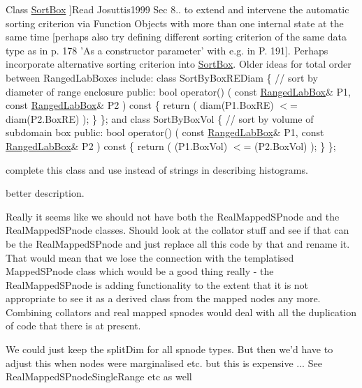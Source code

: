 \begin{DoxyRefList}
\-Class \hyperlink{classSortBox}{\-Sort\-Box} ]\-Read \-Josuttis1999 \-Sec 8.. to extend and intervene the automatic sorting criterion via \-Function \-Objects with more than one internal state at the same time \mbox{[}perhaps also try defining different sorting criterion of the same data type as in p. 178 '\-As a constructor parameter' with e.\-g. in \-P. 191\mbox{]}. \-Perhaps incorporate alternative sorting criterion into \hyperlink{classSortBox}{\-Sort\-Box}. \-Older ideas for total order between \-Ranged\-Lab\-Boxes include\-: class \-Sort\-By\-Box\-R\-E\-Diam \{ // sort by diameter of range enclosure public\-: bool operator() ( const \hyperlink{classRangedLabBox}{\-Ranged\-Lab\-Box}\& \-P1, const \hyperlink{classRangedLabBox}{\-Ranged\-Lab\-Box}\& \-P2 ) const \{ return ( diam(\-P1.\-Box\-R\-E) $<$= diam(\-P2.\-Box\-R\-E) ); \} \}; and class \-Sort\-By\-Box\-Vol \{ // sort by volume of subdomain box public\-: bool operator() ( const \hyperlink{classRangedLabBox}{\-Ranged\-Lab\-Box}\& \-P1, const \hyperlink{classRangedLabBox}{\-Ranged\-Lab\-Box}\& \-P2 ) const \{ return ( (\-P1.\-Box\-Vol) $<$= (\-P2.\-Box\-Vol) ); \} \};  
\item[\label{todo__todo000001}%
\hypertarget{todo__todo000001}{}%
\-Class \hyperlink{classsubpavings_1_1HistDescription}{subpavings\-:\-:\-Hist\-Description} ]complete this class and use instead of strings in describing histograms. 
\item[\label{todo__todo000003}%
\hypertarget{todo__todo000003}{}%
\-Member \hyperlink{classsubpavings_1_1MappedSPnode_a83d5b7a4609c73e1818fe2d3231c0979}{subpavings\-:\-:\-Mapped\-S\-Pnode$<$ \-T $>$\-:\-:slice} (const std\-::vector$<$ int $>$ \&slice\-Dims, const std\-::vector$<$ cxsc\-::real $>$ \&slice\-Pts)]better description.  
\item[\label{todo__todo000007}%
\hypertarget{todo__todo000007}{}%
\-Class \hyperlink{classsubpavings_1_1RealMappedSPnode}{subpavings\-:\-:\-Real\-Mapped\-S\-Pnode} ]\-Really it seems like we should not have both the \-Real\-Mapped\-S\-Pnode and the \-Real\-Mapped\-S\-Pnode classes. \-Should look at the collator stuff and see if that can be the \-Real\-Mapped\-S\-Pnode and just replace all this code by that and rename it. \-That would mean that we lose the connection with the templatised \-Mapped\-S\-Pnode class which would be a good thing really -\/ the \-Real\-Mapped\-S\-Pnode is adding functionality to the extent that it is not appropriate to see it as a derived class from the mapped nodes any more. \-Combining collators and real mapped spnodes would deal with all the duplication of code that there is at present.  
\item[\label{todo__todo000014}%
\hypertarget{todo__todo000014}{}%
\-Member \hyperlink{classsubpavings_1_1SPnode_ad04e240d9152c1a927c2ec280aa29371}{subpavings\-:\-:\-S\-Pnode\-:\-:get\-Split\-Dim} () const ]\-We could just keep the split\-Dim for all spnode types. \-But then we'd have to adjust this when nodes were marginalised etc. but this is expensive ... \-See \-Real\-Mapped\-S\-Pnode\-Single\-Range etc as well 
\end{DoxyRefList}